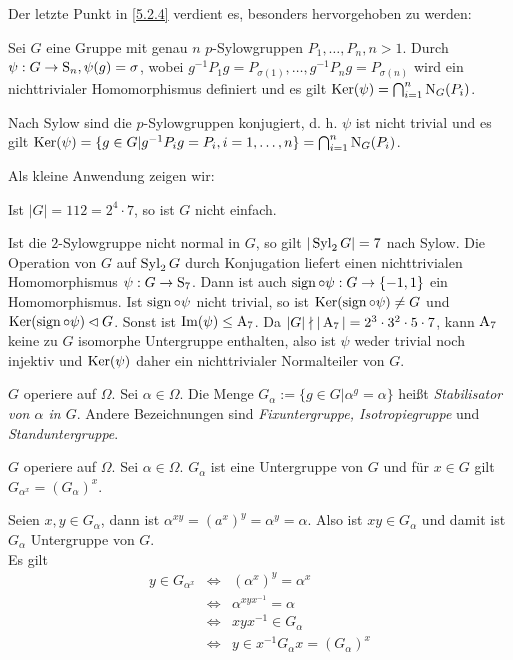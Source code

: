 Der letzte Punkt in \ref{5.2.4} verdient es, besonders hervorgehoben zu werden:
\begin{satz}
 Sei $G$ eine Gruppe mit genau $n$ $p$-Sylowgruppen $P_1,\ldots,P_n, n>1$. Durch $\psi:G\to \operatorname{S}_n, \psi(g)=\sigma$, wobei $g^{-1}P_1g=P_{\sigma(1)},\ldots,g^{-1}P_ng=P_{\sigma(n)}$ wird ein nichttrivialer Homomorphismus definiert und es gilt $\operatorname{Ker}(\psi)=\bigcap_{i=1}^n \operatorname{N}_G(P_i)$.
\end{satz}
\begin{beweis}
 Nach Sylow sind die $p$-Sylowgruppen konjugiert, d. h. $\psi$ ist nicht trivial und es gilt $\operatorname{Ker}(\psi)=\lbrace g\in G| g^{-1}P_ig=P_i, i=1,\ldots,n \rbrace = \bigcap_{i=1}^n \operatorname{N}_G(P_i)$.
\end{beweis}
Als kleine Anwendung zeigen wir:
\begin{satz} 
 Ist $|G|=112=2^4\cdot7$, so ist $G$ nicht einfach.
\end{satz}
\begin{beweis}
 Ist die $2$-Sylowgruppe nicht normal in $G$, so gilt $|\operatorname{Syl}_2G|=7$ nach Sylow. Die Operation von $G$ auf $\operatorname{Syl}_2G$ durch Konjugation liefert einen nichttrivialen Homomorphismus $\psi:G\to \operatorname{S}_7$. Dann ist auch $\operatorname{sign}\circ\psi:G\to \lbrace -1,1 \rbrace$ ein Homomorphismus. Ist $\operatorname{sign}\circ\psi$ nicht trivial, so ist $\operatorname{Ker}(\operatorname{sign}\circ\psi)\neq G$ und $\operatorname{Ker}(\operatorname{sign}\circ\psi)\lhd G$. Sonst ist $\operatorname{Im}(\psi)\leq \operatorname{A}_7$. Da $|G| \nmid |\operatorname{A}_7|=2^3\cdot 3^2 \cdot 5\cdot 7$, kann $\operatorname{A}_7$ keine zu $G$ isomorphe Untergruppe enthalten, also ist $\psi$ weder trivial noch injektiv und $\operatorname{Ker}(\psi)$ daher ein nichttrivialer Normalteiler von $G$.
\end{beweis}
\begin{definition}[Stabilisator]
 $G$ operiere auf $\Omega$. Sei $\alpha\in\Omega$. Die Menge $G_\alpha:=\lbrace g\in G|\alpha^g=\alpha \rbrace$ hei\ss{}t \emph{Stabilisator von $\alpha$ in $G$}. Andere Bezeichnungen sind \emph{Fixuntergruppe, Isotropiegruppe} und \emph{Standuntergruppe}.
\end{definition}

\begin{satz} \label{5.6}
 $G$ operiere auf $\Omega$. Sei $\alpha \in \Omega$. $G_\alpha$ ist eine Untergruppe von $G$ und f\"ur $x\in G$ gilt $G_{\alpha^x}=(G_\alpha)^x$.
\end{satz}
\begin{beweis}
 Seien $x,y\in G_\alpha$, dann ist $\alpha^{xy}=(a^x)^y = \alpha^y = \alpha$. Also ist $xy\in G_\alpha$ und damit ist $G_\alpha$ Untergruppe von $G$.\\
 Es gilt 
\begin{eqnarray*}y\in G_{\alpha^x} &\Longleftrightarrow& (\alpha^x)^y = \alpha^x \\ &\Longleftrightarrow& \alpha^{xyx^{-1}}=\alpha \\&\Longleftrightarrow& xyx^{-1}\in G_\alpha \\ &\Longleftrightarrow& y\in x^{-1}G_\alpha x=(G_\alpha)^x
 \end{eqnarray*}

\end{beweis}

